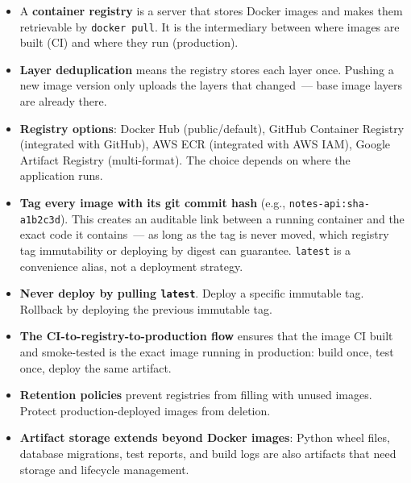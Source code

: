 \label{19-artifact-storage:key-takeaways}
\begin{takeaways}

\begin{itemize}
\tightlist
\item
  A \textbf{container registry} is a server that stores Docker images and makes them retrievable by \texttt{docker\ pull}. It is the intermediary between where images are built (CI) and where they run (production).
\item
  \textbf{Layer deduplication} means the registry stores each layer once. Pushing a new image version only uploads the layers that changed~--- base image layers are already there.
\item
  \textbf{Registry options}: Docker Hub (public/default), GitHub Container Registry (integrated with GitHub), AWS ECR (integrated with AWS IAM), Google Artifact Registry (multi-format). The choice depends on where the application runs.
\item
  \textbf{Tag every image with its git commit hash} (e.g., \texttt{notes-api:sha-a1b2c3d}). This creates an auditable link between a running container and the exact code it contains~--- as long as the tag is never moved, which registry tag immutability or deploying by digest can guarantee. \texttt{latest} is a convenience alias, not a deployment strategy.
\item
  \textbf{Never deploy by pulling \texttt{latest}}. Deploy a specific immutable tag. Rollback by deploying the previous immutable tag.
\item
  \textbf{The CI-to-registry-to-production flow} ensures that the image CI built and smoke-tested is the exact image running in production: build once, test once, deploy the same artifact.
\item
  \textbf{Retention policies} prevent registries from filling with unused images. Protect production-deployed images from deletion.
\item
  \textbf{Artifact storage extends beyond Docker images}: Python wheel files, database migrations, test reports, and build logs are also artifacts that need storage and lifecycle management.
\end{itemize}

\end{takeaways}

\label{19-artifact-storage:exercises}

